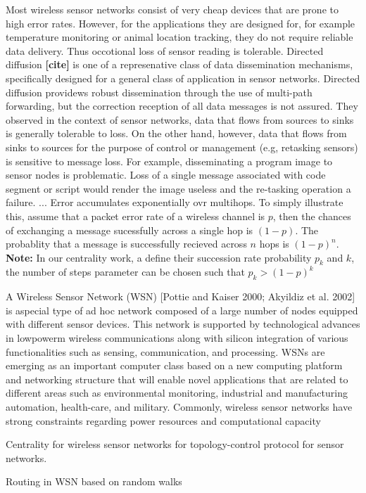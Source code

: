 \documentclass[envcountsame]{llncs}
\begin{document}
\citep{wan2002psfq} Most wireless sensor networks consist of very cheap devices that are prone to high error rates. However, for the applications they are designed for, for example temperature monitoring or animal location tracking, they do not require reliable data delivery. Thus occotional loss of sensor reading is tolerable. Directed diffusion \textbf{[cite]} is one of a represenative class of data dissemination mechanisms, specifically designed for a general class of application in sensor networks. Directed diffusion providews robust dissemination through the use of multi-path forwarding, but the correction reception of all data messages is not assured. They observed in the context of sensor networks, data that flows from sources to sinks is generally tolerable to loss. On the other hand, however, data that flows from sinks to sources for the purpose of control or management (e.g, retasking sensors) is sensitive to message loss. For example, disseminating a program image to sensor nodes is problematic. Loss of a single message associated with code segment or script would render the image useless and the re-tasking operation a failure. ... Error accumulates exponentially ovr multihops. To simply illustrate this, assume that a packet error rate of a wireless channel is $p$, then the chances of exchanging a message sucessfully across a single hop is $(1-p)$. The probablity that a message is successfully recieved across $n$ hops is $(1-p)^n$. \textbf{Note:} In our centrality work, a define their succession rate probability $p_k$ and $k$, the number of steps parameter can be chosen such that $p_k > (1-p)^k$ 

\citep{nakamura2007information} A Wireless Sensor Network (WSN) [Pottie and Kaiser 2000; Akyildiz et al. 2002] is aspecial type of ad hoc network composed of a large number of nodes equipped with different sensor devices. This network is supported by technological advances in lowpowerm wireless communications along with silicon integration of various functionalities
such as sensing, communication, and processing. WSNs are emerging as an important
computer class based on a new computing platform and networking structure that will
enable novel applications that are related to different areas such as environmental
monitoring, industrial and manufacturing automation, health-care, and military. Commonly,
wireless sensor networks have strong constraints regarding power resources
and computational capacity

\cite{cuzzocrea2012edge} Centrality for wireless sensor networks for topology-control
protocol for sensor networks.

\cite{tian2005randomwalk} Routing in WSN based on random walks

	
	
\end{document}
